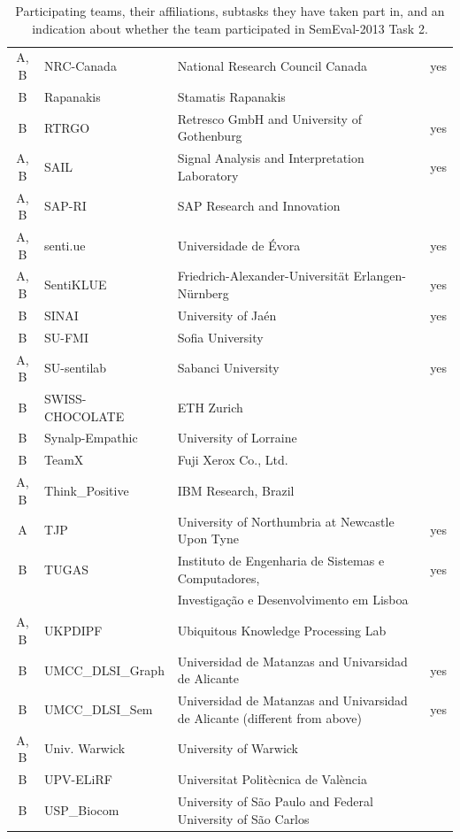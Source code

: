 \documentclass[11pt]{article}
\begin{document}
{\begin{table}[ht!]
\begin{center}
\begin{tabular}{|c|l|l|c|}
  A, B & NRC-Canada & National Research Council Canada & yes\\
  B & Rapanakis & Stamatis Rapanakis &\\
  B & RTRGO & Retresco GmbH and University of Gothenburg & yes\\
  A, B & SAIL & Signal Analysis and Interpretation Laboratory & yes\\
  A, B & SAP-RI & SAP Research and Innovation &\\
  A, B & senti.ue & Universidade de \'{E}vora & yes\\
  A, B & SentiKLUE & Friedrich-Alexander-Universit\"{a}t Erlangen-N\"{u}rnberg & yes\\
  B & SINAI & University of Ja\'{e}n & yes\\
  B & SU-FMI & Sofia University &\\
  A, B & SU-sentilab & Sabanci University & yes\\
  B & SWISS-CHOCOLATE & ETH Zurich &\\
  B & Synalp-Empathic & University of Lorraine &\\
  B & TeamX & Fuji Xerox Co., Ltd. &\\
  A, B & Think\_Positive & IBM Research, Brazil &\\
  A & TJP & University of Northumbria at Newcastle Upon Tyne & yes\\
  B & TUGAS & Instituto de Engenharia de Sistemas e Computadores, & yes\\
  & & Investiga\c{c}\~{a}o e Desenvolvimento em Lisboa &  \\
  A, B & UKPDIPF & Ubiquitous Knowledge Processing Lab &\\
  B & UMCC\_DLSI\_Graph & Universidad de Matanzas and Univarsidad de Alicante & yes\\
  B & UMCC\_DLSI\_Sem & Universidad de Matanzas and Univarsidad de Alicante  (different from above) & yes\\
  A, B & Univ. Warwick & University of Warwick &\\
  B & UPV-ELiRF & Universitat Polit\`{e}cnica de Val\`{e}ncia &\\
  B & USP\_Biocom & University of S\~{a}o Paulo and Federal University of S\~{a}o Carlos &\\
\hline
\end{tabular}
\caption{Participating teams, their affiliations, subtasks they have taken part in,
         and an indication about whether the team participated in SemEval-2013 Task 2.}
\label{T:teams}
\end{center}
\end{table}
\clearpage}




\end{document}
